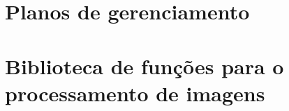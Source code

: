 \begin{apendicesenv}
\chapter{Planos de gerenciamento} \label{appendix:planos}



\chapter{Biblioteca de funções para o processamento de imagens}



\end{apendicesenv}
